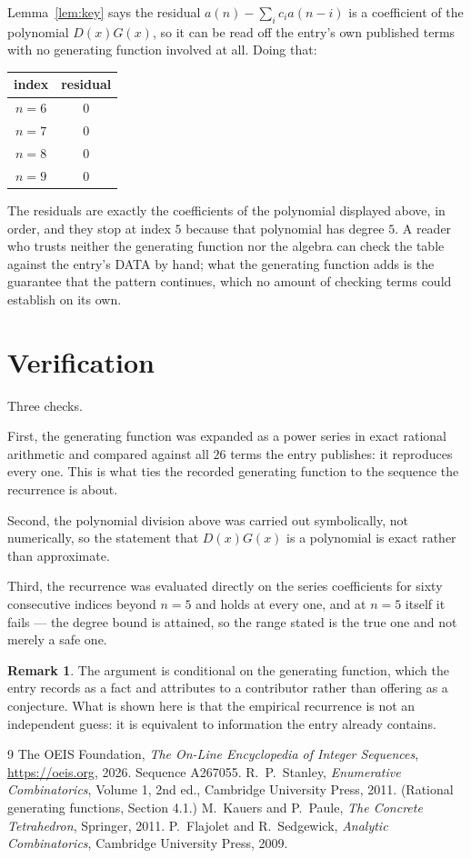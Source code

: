 \documentclass[11pt,a4paper]{article}
\theoremstyle{plain}
\theoremstyle{definition}
\newtheorem{remark}[theorem]{Remark}
\begin{document}
Lemma~\ref{lem:key} says the residual $a(n)-\sum_ic_ia(n-i)$ is a coefficient of the
polynomial $D(x)G(x)$, so it can be read off the entry's own published terms with no
generating function involved at all. Doing that:
\begin{center}
\begin{tabular}{cc}
index & residual \\ \hline
$n=6$ & $0$ \\
$n=7$ & $0$ \\
$n=8$ & $0$ \\
$n=9$ & $0$
\end{tabular}
\end{center}
The residuals are exactly the coefficients of the polynomial displayed above, in order, and
they stop at index $5$ because that polynomial has degree $5$. A reader who trusts
neither the generating function nor the algebra can check the table against the entry's DATA
by hand; what the generating function adds is the guarantee that the pattern continues, which
no amount of checking terms could establish on its own.

\section{Verification}

Three checks.

First, the generating function was expanded as a power series in exact rational arithmetic and
compared against all $26$ terms the entry publishes: it reproduces every one. This is
what ties the recorded generating function to the sequence the recurrence is about.

Second, the polynomial division above was carried out symbolically, not numerically, so the
statement that $D(x)G(x)$ is a polynomial is exact rather than approximate.

Third, the recurrence was evaluated directly on the series coefficients for sixty consecutive
indices beyond $n=5$ and holds at every one, and at $n=5$ itself it fails --- the
degree bound is attained, so the range stated is the true one and not merely a safe one.

\begin{remark}
The argument is conditional on the generating function, which the entry records as a fact and
attributes to a contributor rather than offering as a conjecture. What is shown here is that
the empirical recurrence is not an independent guess: it is equivalent to information the
entry already contains.
\end{remark}

\begin{thebibliography}{9}
 The OEIS Foundation, \emph{The On-Line Encyclopedia of Integer
Sequences}, \url{https://oeis.org}, 2026. Sequence A267055.
 R.~P.~Stanley, \emph{Enumerative Combinatorics}, Volume 1, 2nd ed.,
Cambridge University Press, 2011. (Rational generating functions, Section 4.1.)
 M.~Kauers and P.~Paule, \emph{The Concrete Tetrahedron}, Springer, 2011.
 P.~Flajolet and R.~Sedgewick, \emph{Analytic Combinatorics}, Cambridge
University Press, 2009.
\end{thebibliography}
\end{document}
